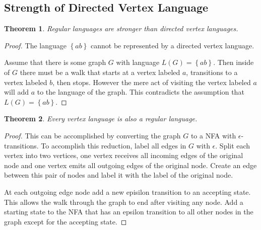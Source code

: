 \documentclass[12pt]{article}
\newtheorem{theorem}{Theorem}
\begin{document}
\clearpage

\subsection{Strength of Directed Vertex Language}

\begin{theorem}
Regular languages are stronger than directed vertex languages.
\end{theorem}
\begin{proof}
The language $\left\{ab\right\}$ cannot be represented by a directed vertex language.

Assume that there is some graph $G$ with language $L(G)=\left\{ab\right\}$. Then inside of
$G$ there must be a walk that starts at a vertex labeled $a$, transitions to a vertex labeled
$b$, then stops. However the mere act of visiting the vertex labeled $a$ will add $a$ to 
the language of the graph. This contradicts the assumption that $L(G)=\left\{ab\right\}$.
\end{proof}

\begin{theorem}
Every vertex language is also a regular language.
\end{theorem}
\begin{proof}
This can be accomplished by converting the graph $G$ to a NFA with $\epsilon$-transitions.
To accomplish this reduction, label all edges in $G$ with $\epsilon$. Split each vertex
into two vertices, one vertex receives all incoming edges of the original node and one
vertex emits all outgoing edges of the original node. Create an edge between this pair
of nodes and label it with the label of the original node.

At each outgoing edge node add a new episilon transition to an accepting state.
This allows the walk through the graph to end after visiting any node. Add a starting
state to the NFA that has an epsilon transition to all other nodes in the graph
except for the accepting state.
\end{proof}
\end{document}
